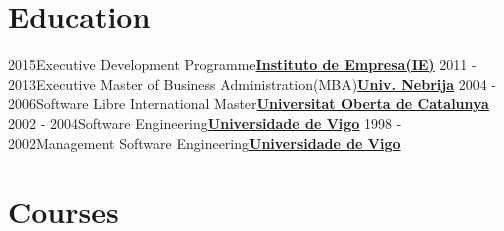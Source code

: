 \documentclass[a4paper]{twentysecondcv} %
\begin{document}
\section{Education}

\begin{twenty} %
	\twentyitem
    	{2015}{}{Executive Development Programme}{\href{https://www.ie.edu/es/}{\textbf{Instituto de Empresa(IE)}}}{}{}
	\twentyitem
    	{2011 - 2013}{}{Executive Master of Business Administration(MBA)}{\href{https://www.nebrija.com/}{\textbf{Univ. Nebrija}}}{}{}
	\twentyitem
    	{2004 - 2006}{}{Software Libre International Master}{\href{https://www.uoc.edu/}{\textbf{Universitat Oberta de Catalunya}}}{}{}
	\twentyitem
    	{2002 - 2004}{}{Software Engineering}{\href{https://esei.uvigo.es/}{\textbf{Universidade de Vigo}}}{}{}
	\twentyitem
    	{1998 - 2002}{}{Management Software Engineering}{\href{https://esei.uvigo.es/}{\textbf{Universidade de Vigo}}}{}{}
\end{twenty}

\section{Courses}
\end{document}
